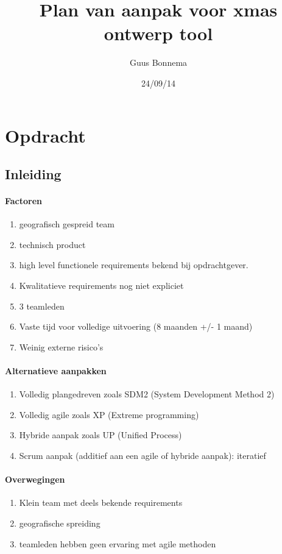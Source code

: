 \documentclass[a4paper,11pt,twoside,draft]{article}
\author{Guus Bonnema}
\date{24/09/14}
\title{Plan van aanpak voor xmas ontwerp tool}
\begin{document}
\section{Opdracht}

\subsection{Inleiding}

\paragraph{Factoren}

\begin{enumerate}
\item geografisch gespreid team
\item technisch product
\item high level functionele requirements bekend bij opdrachtgever.
\item Kwalitatieve requirements nog niet expliciet
\item 3 teamleden
\item Vaste tijd voor volledige uitvoering (8 maanden +/- 1 maand)
\item Weinig externe risico's
\end{enumerate}



\paragraph{Alternatieve aanpakken}

\begin{enumerate}
\item Volledig plangedreven zoals SDM2 (System Development Method 2)
\item Volledig agile zoals XP (Extreme programming)
\item Hybride aanpak zoals UP (Unified Process)
\item Scrum aanpak (additief aan een agile of hybride aanpak): iteratief
\end{enumerate}

\paragraph{Overwegingen}

\begin{enumerate}
\item Klein team met deels bekende requirements
\item geografische spreiding
\item teamleden hebben geen ervaring met agile methoden
\end{enumerate}
\end{document}
